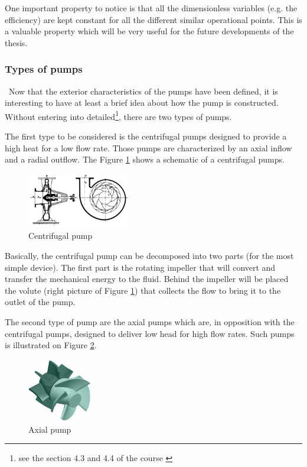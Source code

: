 One important property to notice is that all the dimensionless variables (e.g. the efficiency) are kept constant for all the different similar operational points. This is a valuable property which will be very useful for the future developments of the thesis.
\subsubsection{Types of pumps}
\quad\, Now that the exterior characteristics of the pumps have been defined, it is interesting to have at least a brief idea about how the pump is constructed. Without entering into detailed\footnote{see the section 4.3 and 4.4 of the course \citep{Hillewaert2019}}, there are two types of pumps.

The first type to be considered is the centrifugal pumps designed to provide a high heat for a low flow rate. Those pumps are characterized by an axial inflow and a radial outflow. The Figure \ref{fig:C3_centri_pump} shows a schematic of a centrifugal pumps.
\begin{figure}[h]
\centering
\includegraphics[width=0.4\textwidth]{centri_pump.png}
\caption{Centrifugal pump \citep{Hillewaert2019}}
\label{fig:C3_centri_pump}
\end{figure}

Basically, the centrifugal pump can be decomposed into two parts (for the most simple device). The first  part is the rotating impeller that will convert and transfer the mechanical energy to the fluid. Behind the impeller will be placed the volute (right picture of Figure \ref{fig:C3_centri_pump}) that collects the flow to bring it to the outlet of the pump.\newpage

The second type of pump are the axial pumps which are, in opposition with the centrifugal pumps, designed to deliver low head for high flow rates. Such pumps is illustrated on Figure \ref{fig:C3_axial_pump}. 
\begin{figure}[h!]
\centering
\includegraphics[width=0.25\textwidth]{axial_pump.png}
\caption{Axial pump \citep{Hillewaert2019}}
\label{fig:C3_axial_pump}
\end{figure}

